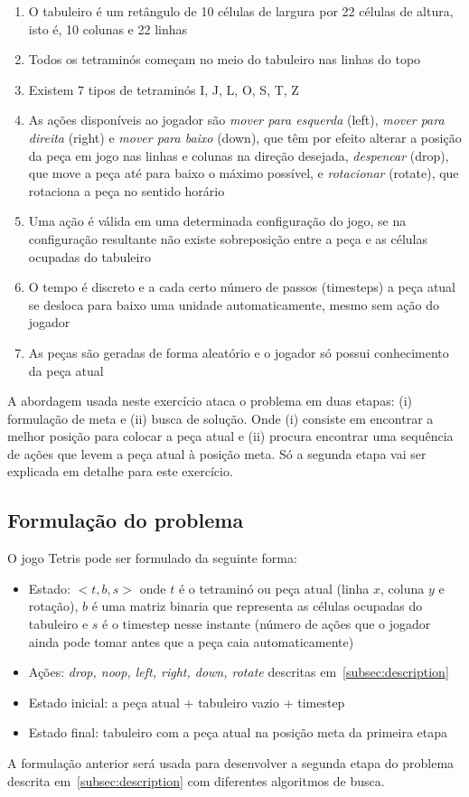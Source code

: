 \begin{enumerate}
	\item O tabuleiro é um retângulo de 10 células de largura por 22 células de altura, isto é, 10 colunas e 22 linhas
	\item Todos os tetraminós começam no meio do tabuleiro nas linhas do topo
	\item Existem 7 tipos de tetraminós I, J, L, O, S, T, Z
	\item As ações disponíveis ao jogador são \textit{mover para esquerda} (left), \textit{mover para direita} (right) e \textit{mover para baixo} (down), que têm por efeito alterar a posição da peça em jogo nas linhas e colunas na direção desejada, \textit{despencar} (drop), que move a peça até para baixo o máximo possível, e \textit{rotacionar} (rotate), que rotaciona a peça no sentido horário
	\item Uma ação é válida em uma determinada configuração do jogo, se na configuração resultante não existe sobreposição entre a peça e as células ocupadas do tabuleiro
	\item O tempo é discreto e a cada certo número de passos (timesteps) a peça atual se desloca para baixo uma unidade automaticamente, mesmo sem ação do jogador
	\item As peças são geradas de forma aleatório e o jogador só possui conhecimento da peça atual
\end{enumerate}

A abordagem usada neste exercício ataca o problema em duas etapas: (i) formulação de meta e (ii) busca de solução. Onde (i) consiste em encontrar a melhor posição para colocar a peça atual e (ii) procura encontrar uma sequência de ações que levem a peça atual à posição meta. Só a segunda etapa vai ser explicada em detalhe para este exercício.

\subsection{Formulação do problema}
\label{subsec:formulation}

O jogo Tetris pode ser formulado da seguinte forma:

\begin{itemize}
	\item Estado: $<t , b , s>$ onde $t$ é o tetraminó ou peça atual (linha $x$, coluna $y$ e rotação), $b$ é uma matriz binaria que representa as células ocupadas do tabuleiro e $s$ é o timestep nesse instante (número de ações que o jogador ainda pode tomar antes que a peça caia automaticamente)
	\item Ações: \textit{drop, noop, left, right, down, rotate} descritas em~\ref{subsec:description}
	\item Estado inicial: a peça atual + tabuleiro vazio + timestep
	\item Estado final: tabuleiro com a peça atual na posição meta da primeira etapa
\end{itemize}

A formulação anterior será usada para desenvolver a segunda etapa do problema descrita em~\ref{subsec:description} com diferentes algoritmos de busca.